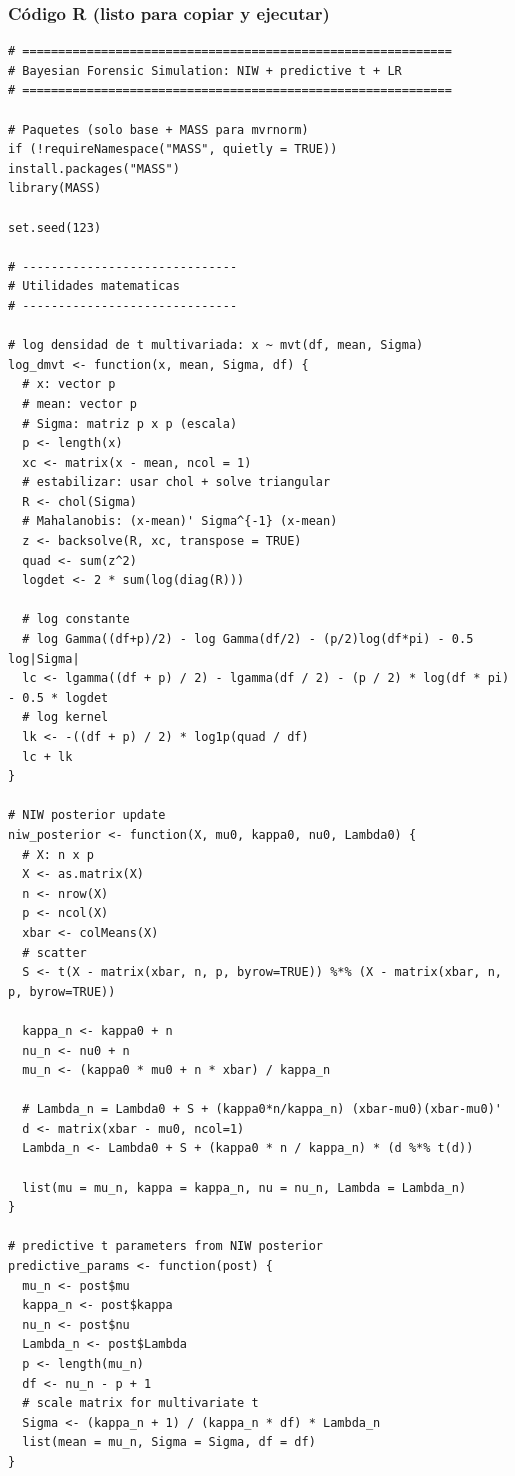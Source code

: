 \documentclass[a4paper,10pt,oneside]{article}
\begin{document}
\subsubsection*{C\'odigo \textsf{R} (listo para copiar y ejecutar)}

\begin{verbatim}
# ============================================================
# Bayesian Forensic Simulation: NIW + predictive t + LR
# ============================================================

# Paquetes (solo base + MASS para mvrnorm)
if (!requireNamespace("MASS", quietly = TRUE)) install.packages("MASS")
library(MASS)

set.seed(123)

# ------------------------------
# Utilidades matematicas
# ------------------------------

# log densidad de t multivariada: x ~ mvt(df, mean, Sigma)
log_dmvt <- function(x, mean, Sigma, df) {
  # x: vector p
  # mean: vector p
  # Sigma: matriz p x p (escala)
  p <- length(x)
  xc <- matrix(x - mean, ncol = 1)
  # estabilizar: usar chol + solve triangular
  R <- chol(Sigma)
  # Mahalanobis: (x-mean)' Sigma^{-1} (x-mean)
  z <- backsolve(R, xc, transpose = TRUE)
  quad <- sum(z^2)
  logdet <- 2 * sum(log(diag(R)))

  # log constante
  # log Gamma((df+p)/2) - log Gamma(df/2) - (p/2)log(df*pi) - 0.5 log|Sigma|
  lc <- lgamma((df + p) / 2) - lgamma(df / 2) - (p / 2) * log(df * pi) - 0.5 * logdet
  # log kernel
  lk <- -((df + p) / 2) * log1p(quad / df)
  lc + lk
}

# NIW posterior update
niw_posterior <- function(X, mu0, kappa0, nu0, Lambda0) {
  # X: n x p
  X <- as.matrix(X)
  n <- nrow(X)
  p <- ncol(X)
  xbar <- colMeans(X)
  # scatter
  S <- t(X - matrix(xbar, n, p, byrow=TRUE)) %*% (X - matrix(xbar, n, p, byrow=TRUE))

  kappa_n <- kappa0 + n
  nu_n <- nu0 + n
  mu_n <- (kappa0 * mu0 + n * xbar) / kappa_n

  # Lambda_n = Lambda0 + S + (kappa0*n/kappa_n) (xbar-mu0)(xbar-mu0)'
  d <- matrix(xbar - mu0, ncol=1)
  Lambda_n <- Lambda0 + S + (kappa0 * n / kappa_n) * (d %*% t(d))

  list(mu = mu_n, kappa = kappa_n, nu = nu_n, Lambda = Lambda_n)
}

# predictive t parameters from NIW posterior
predictive_params <- function(post) {
  mu_n <- post$mu
  kappa_n <- post$kappa
  nu_n <- post$nu
  Lambda_n <- post$Lambda
  p <- length(mu_n)
  df <- nu_n - p + 1
  # scale matrix for multivariate t
  Sigma <- (kappa_n + 1) / (kappa_n * df) * Lambda_n
  list(mean = mu_n, Sigma = Sigma, df = df)
}


\end{verbatim}
\end{document}

